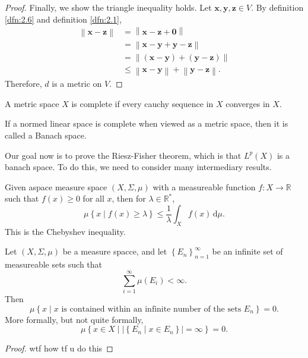 \documentclass[11pt, letterpaper]{report}
\begin{document}
\begin{proof}
	Finally, we show the triangle inequality holds. Let $\mathbf{x},\mathbf{y},\mathbf{z}\in V$. By definition \ref{dfn:2.6} and definition \ref{dfn:2.1},
	\begin{align*}
		\left\lVert \mathbf{x}-\mathbf{z} \right\rVert &=\left\lVert \mathbf{x}-\mathbf{z}+\mathbf{0} \right\rVert \\
							       &=\left\lVert \mathbf{x}-\mathbf{y}+\mathbf{y}-\mathbf{z} \right\rVert \\
							       &=\left\lVert \left( \mathbf{x}-\mathbf{y} \right) +\left( \mathbf{y}-\mathbf{z} \right)  \right\rVert\\
							       &\leq \left\lVert \mathbf{x}-\mathbf{y} \right\rVert +\left\lVert \mathbf{y}-\mathbf{z} \right\rVert 
	.\end{align*}
	Therefore, $d$ is a metric on $V$.
\end{proof}
\begin{definition}[Complete]\label{dfn:2.7}
	A metric space $X$ is complete if every cauchy sequence in $X$ converges in $X$.
\end{definition}
\begin{definition}\label{dfn:2.8}
	If a normed linear space is complete when viewed as a metric space, then it is called a Banach space.
\end{definition}
Our goal now is to prove the Riesz-Fisher theorem, which is that $L^p(X)$ is a banach space. To do this, we need to consider many intermediary results.
\begin{prev}\label{prv:1}
	Given aspace measure space $(X,\Sigma ,\mu )$ with a measureable function $f : X \to \mathbb{R}$ such that $f(x)\geq 0$ for all $x$, then for $\lambda \in\mathbb{R}^*$,
	\[
		\mu \left\{ x \mid f(x)\geq \lambda  \right\} \leq \frac{1}{\lambda }\int_X f(x) \,\mathrm{d} \mu 
	.\]
	This is the Chebyshev inequality.
\end{prev}
\begin{lemma}\label{lma:2.3}
	Let $(X,\Sigma ,\mu )$ be a measure spacce, and let $\left\{ E_n \right\}_{n=1}^\infty$ be an infinite set of measureable sets such that
	\[
		\sum_{i=1}^{\infty} \mu \left( E_i \right) <\infty
	.\]
	Then
	\[
		\mu \left\{ x \mid x\text{ is contained within an infinite number of the sets }E_n \right\} =0
	.\]
	More formally, but not quite formally,
	\[
		\mu \left\{ x\in X \mid \left| \left\{ E_n \mid x\in E_n \right\}  \right| =\infty \right\} =0
	.\]
\end{lemma}
\begin{proof}
	wtf how tf u do this
\end{proof}
\end{document}
